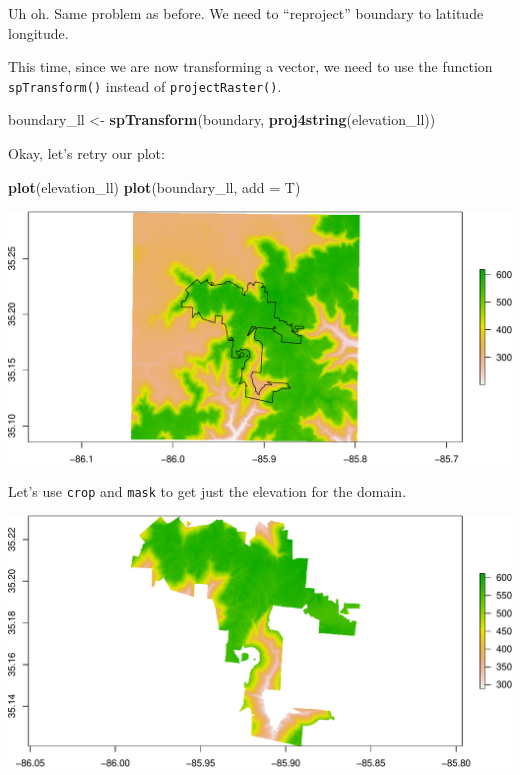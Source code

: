 \documentclass[]{book}
\newenvironment{Shaded}{\begin{snugshade}}{\end{snugshade}}
\newcommand{\DataTypeTok}[1]{\textcolor[rgb]{0.13,0.29,0.53}{#1}}
\newcommand{\KeywordTok}[1]{\textcolor[rgb]{0.13,0.29,0.53}{\textbf{#1}}}
\newcommand{\NormalTok}[1]{#1}
\newcommand{\StringTok}[1]{\textcolor[rgb]{0.31,0.60,0.02}{#1}}
\begin{document}
Uh oh. Same problem as before. We need to ``reproject'' boundary to latitude longitude.

This time, since we are now transforming a vector, we need to use the function \texttt{spTransform()} instead of \texttt{projectRaster()}.

\begin{Shaded}
\begin{Highlighting}[]
\NormalTok{boundary_ll <-}\StringTok{ }\KeywordTok{spTransform}\NormalTok{(boundary, }\KeywordTok{proj4string}\NormalTok{(elevation_ll))}
\end{Highlighting}
\end{Shaded}

Okay, let's retry our plot:

\begin{Shaded}
\begin{Highlighting}[]
\KeywordTok{plot}\NormalTok{(elevation_ll)}
\KeywordTok{plot}\NormalTok{(boundary_ll, }\DataTypeTok{add =}\NormalTok{ T)}
\end{Highlighting}
\end{Shaded}

\includegraphics{figures/unnamed-chunk-656-1.pdf}

Let's use \texttt{crop} and \texttt{mask} to get just the elevation for the domain.

\includegraphics{figures/unnamed-chunk-657-1.pdf}
\end{document}

